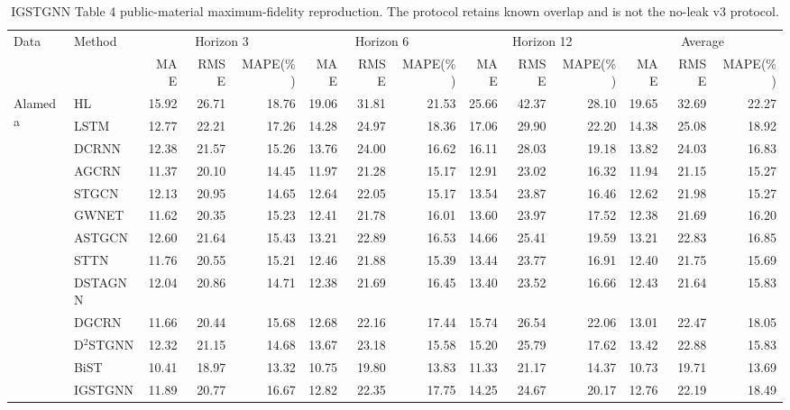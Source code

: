 \begin{table}
\centering
\caption{IGSTGNN Table 4 public-material maximum-fidelity reproduction. The protocol retains known overlap and is not the no-leak v3 protocol.}
\label{tab:igstgnn-table4-public-reproduction}
\setlength{\tabcolsep}{3.5pt}
\begin{tabular}{llrrrrrrrrrrrr}
\toprule
Data & Method & \multicolumn{3}{c}{Horizon 3} & \multicolumn{3}{c}{Horizon 6} & \multicolumn{3}{c}{Horizon 12} & \multicolumn{3}{c}{Average} \\
\cmidrule(lr){3-5}\cmidrule(lr){6-8}\cmidrule(lr){9-11}\cmidrule(lr){12-14}
& & MAE & RMSE & MAPE(\%) & MAE & RMSE & MAPE(\%) & MAE & RMSE & MAPE(\%) & MAE & RMSE & MAPE(\%) \\
\midrule
\multirow{13}{*}{Alameda} & HL & 15.92 & 26.71 & 18.76 & 19.06 & 31.81 & 21.53 & 25.66 & 42.37 & 28.10 & 19.65 & 32.69 & 22.27 \\
 & LSTM & 12.77 & 22.21 & 17.26 & 14.28 & 24.97 & 18.36 & 17.06 & 29.90 & 22.20 & 14.38 & 25.08 & 18.92 \\
 & DCRNN & 12.38 & 21.57 & 15.26 & 13.76 & 24.00 & 16.62 & 16.11 & 28.03 & 19.18 & 13.82 & 24.03 & 16.83 \\
 & AGCRN & 11.37 & 20.10 & 14.45 & 11.97 & 21.28 & 15.17 & 12.91 & 23.02 & 16.32 & 11.94 & 21.15 & 15.27 \\
 & STGCN & 12.13 & 20.95 & 14.65 & 12.64 & 22.05 & 15.17 & 13.54 & 23.87 & 16.46 & 12.62 & 21.98 & 15.27 \\
 & GWNET & 11.62 & 20.35 & 15.23 & 12.41 & 21.78 & 16.01 & 13.60 & 23.97 & 17.52 & 12.38 & 21.69 & 16.20 \\
 & ASTGCN & 12.60 & 21.64 & 15.43 & 13.21 & 22.89 & 16.53 & 14.66 & 25.41 & 19.59 & 13.21 & 22.83 & 16.85 \\
 & STTN & 11.76 & 20.55 & 15.21 & 12.46 & 21.88 & 15.39 & 13.44 & 23.77 & 16.91 & 12.40 & 21.75 & 15.69 \\
 & DSTAGNN & 12.04 & 20.86 & 14.71 & 12.38 & 21.69 & 16.45 & 13.40 & 23.52 & 16.66 & 12.43 & 21.64 & 15.83 \\
 & DGCRN & 11.66 & 20.44 & 15.68 & 12.68 & 22.16 & 17.44 & 15.74 & 26.54 & 22.06 & 13.01 & 22.47 & 18.05 \\
 & D$^2$STGNN & 12.32 & 21.15 & 14.68 & 13.67 & 23.18 & 15.58 & 15.20 & 25.79 & 17.62 & 13.42 & 22.88 & 15.83 \\
 & BiST & 10.41 & 18.97 & 13.32 & 10.75 & 19.80 & 13.83 & 11.33 & 21.17 & 14.37 & 10.73 & 19.71 & 13.69 \\
 & IGSTGNN & 11.89 & 20.77 & 16.67 & 12.82 & 22.35 & 17.75 & 14.25 & 24.67 & 20.17 & 12.76 & 22.19 & 18.49 \\

\end{tabular}
\end{table}
